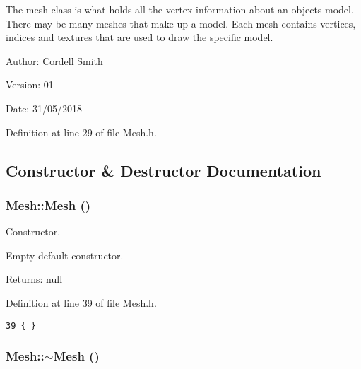The mesh class is what holds all the vertex information about an objects model. There may be many meshes that make up a model. Each mesh contains vertices, indices and textures that are used to draw the specific model.

\begin{Desc}
\item[Author:]Cordell Smith \end{Desc}
\begin{Desc}
\item[Version:]01 \end{Desc}
\begin{Desc}
\item[Date:]31/05/2018 \end{Desc}


Definition at line 29 of file Mesh.h.

\subsection{Constructor \& Destructor Documentation}
\hypertarget{class_mesh_2af137f1571af89172b9c102302c416b}{
\subsubsection[Mesh]{\setlength{\rightskip}{0pt plus 5cm}Mesh::Mesh ()}}
\label{class_mesh_2af137f1571af89172b9c102302c416b}


Constructor. 

Empty default constructor.

\begin{Desc}
\item[Returns:]null \end{Desc}


Definition at line 39 of file Mesh.h.

\begin{Code}\begin{verbatim}39 { }
\end{verbatim}
\end{Code}


\hypertarget{class_mesh_5efe4da1a4c0971cfb037bd70304c303}{
\subsubsection[$\sim$Mesh]{\setlength{\rightskip}{0pt plus 5cm}Mesh::$\sim$Mesh ()}}
\label{class_mesh_5efe4da1a4c0971cfb037bd70304c303}


